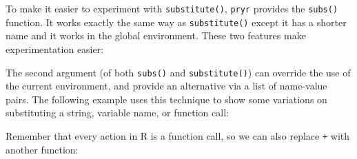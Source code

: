 To make it easier to experiment with \texttt{substitute()},
\texttt{pryr} provides the \texttt{subs()} function. It works exactly
the same way as \texttt{substitute()} except it has a shorter name and
it works in the global environment. These two features make
experimentation easier:

\begin{Shaded}
\begin{Highlighting}[]
\StringTok{ }
\StringTok{ }
\StringTok{ }\StringTok{ }
\end{Highlighting}
\end{Shaded}

The second argument (of both \texttt{subs()} and \texttt{substitute()})
can override the use of the current environment, and provide an
alternative via a list of name-value pairs. The following example uses
this technique to show some variations on substituting a string,
variable name, or function call:

\begin{Shaded}
\begin{Highlighting}[]
\StringTok{ }\NormalTok{(} \NormalTok{))}
\StringTok{ }\NormalTok{(} 
\StringTok{ }\NormalTok{(} \NormalTok{(}\NormalTok{())))}
\end{Highlighting}
\end{Shaded}

Remember that every action in R is a function call, so we can also
replace \texttt{+} with another function:

\begin{Shaded}
\begin{Highlighting}[]
\StringTok{ }\NormalTok{(} \NormalTok{=}\StringTok{ }
\StringTok{ }\NormalTok{(} \NormalTok{=}\StringTok{ }\NormalTok{(}\DataTypeTok{*}\NormalTok{)))}
\end{Highlighting}
\end{Shaded}

